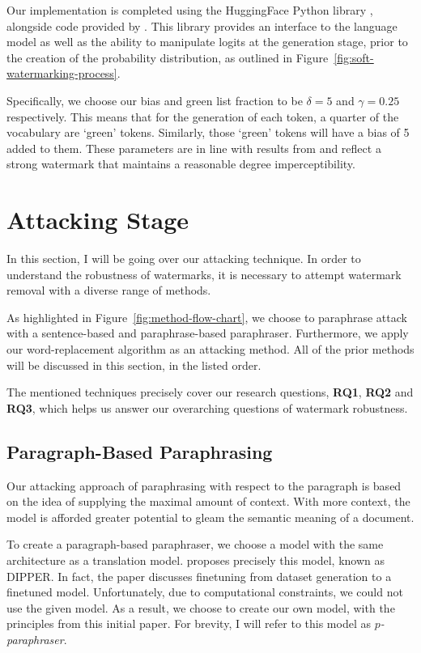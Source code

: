 \documentclass{l4proj}
\theoremstyle{definition}
\begin{document}
        Our implementation is completed using the HuggingFace Python library \citep{wolf-etal-2020-transformers}, alongside code provided by \citet{kirchenbauer2023watermark}. This library provides an interface to the language model as well as the ability to manipulate logits at the generation stage, prior to the creation of the probability distribution, as outlined in Figure~\ref{fig:soft-watermarking-process}. 

        Specifically, we choose our bias and green list fraction to be $\delta = 5$ and $\gamma = 0.25$ respectively. This means that for the generation of each token, a quarter of the vocabulary are `green' tokens. Similarly, those `green' tokens will have a bias of 5 added to them. These parameters are in line with results from \citet{kirchenbauer2023watermark} and reflect a strong watermark that maintains a reasonable degree imperceptibility.

\section{Attacking Stage}
    In this section, I will be going over our attacking technique. In order to understand the robustness of watermarks, it is necessary to attempt watermark removal with a diverse range of methods. 

    As highlighted in Figure~\ref{fig:method-flow-chart}, we choose to paraphrase attack with a sentence-based and paraphrase-based paraphraser. Furthermore, we apply our word-replacement algorithm as an attacking method. All of the prior methods will be discussed in this section, in the listed order.

    The mentioned techniques precisely cover our research questions, \textbf{RQ1}, \textbf{RQ2} and \textbf{RQ3}, which helps us answer our overarching questions of watermark robustness.

    \subsection{Paragraph-Based Paraphrasing}
        Our attacking approach of paraphrasing with respect to the paragraph is based on the idea of supplying the maximal amount of context. With more context, the model is afforded greater potential to gleam the semantic meaning of a document. 
    
        To create a paragraph-based paraphraser, we choose a model with the same architecture as a translation model. \citet{krishna2023paraphrasing} proposes precisely this model, known as DIPPER. In fact, the paper discusses finetuning from dataset generation to a finetuned model. Unfortunately, due to computational constraints, we could not use the given model. As a result, we choose to create our own model, with the principles from this initial paper. For brevity, I will refer to this model as \emph{$p$-paraphraser}.
        
\end{document}
